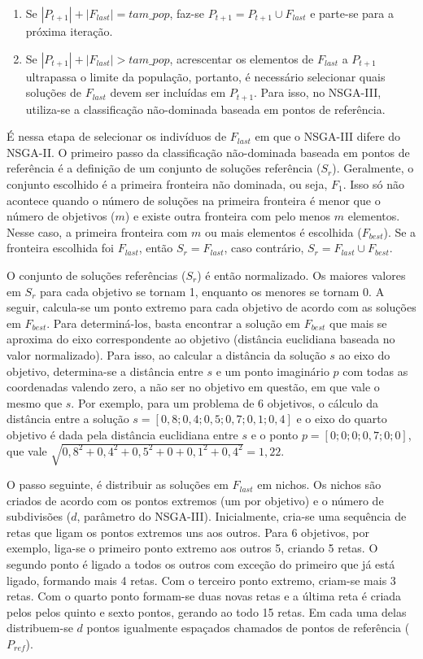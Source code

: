 \begin{enumerate}
	\item Se $|P_{t+1}| + |F_{last}| = tam\_pop$, faz-se $P_{t+1} = P_{t+1} \cup F_{last}$ e parte-se para a próxima iteração.
	\item Se $|P_{t+1}| + |F_{last}| > tam\_pop$, acrescentar os elementos de $F_{last}$ a $P_{t+1}$ ultrapassa o limite da população, portanto, é necessário selecionar quais soluções de $F_{last}$ devem ser incluídas em $P_{t+1}$. Para isso, no NSGA-III, utiliza-se a classificação não-dominada baseada em pontos de referência.
\end{enumerate}

É nessa etapa de selecionar os indivíduos de $F_{last}$ em que o NSGA-III difere do NSGA-II. O primeiro passo da classificação não-dominada baseada em pontos de referência é a definição de um conjunto de soluções referência ($S_r$). Geralmente, o conjunto escolhido é a primeira fronteira não dominada, ou seja, $F_1$. Isso só não acontece quando o número de soluções na primeira fronteira é menor que o número de objetivos ($m$) e existe outra fronteira com pelo menos $m$ elementos. Nesse caso, a primeira fronteira com $m$ ou mais elementos é escolhida ($F_{best}$). Se a fronteira escolhida foi $F_{last}$, então $S_r = F_{last}$, caso contrário, $S_r = F_{last} \cup F_{best}$.

O conjunto de soluções referências ($S_r$) é então normalizado. Os maiores valores em $S_r$ para cada objetivo se tornam 1, enquanto os menores se tornam 0. A seguir, calcula-se um ponto extremo para cada objetivo de acordo com as soluções em $F_{best}$. Para determiná-los, basta encontrar a solução em $F_{best}$ que mais se aproxima do eixo correspondente ao objetivo (distância euclidiana baseada no valor normalizado). Para isso, ao calcular a distância da solução $s$ ao eixo do objetivo, determina-se a distância entre $s$ e um ponto imaginário $p$ com todas as coordenadas valendo zero, a não ser no objetivo em questão, em que vale o mesmo que $s$. Por exemplo, para um problema de 6 objetivos, o cálculo da distância entre a solução $s = [0,8; 0,4; 0,5; 0,7; 0,1; 0,4]$ e o eixo do quarto objetivo é dada pela distância euclidiana entre $s$ e o ponto $p = [0; 0; 0; 0,7; 0; 0]$, que vale $\sqrt{0,8^2 + 0,4^2 + 0,5^2 + 0 + 0,1^2 + 0,4^2} = 1,22$.

O passo seguinte, é distribuir as soluções em $F_{last}$ em nichos. Os nichos são criados de acordo com os pontos extremos (um por objetivo) e o número de subdivisões ($d$, parâmetro do NSGA-III). Inicialmente, cria-se uma sequência de retas que ligam os pontos extremos uns aos outros. Para 6 objetivos, por exemplo, liga-se o primeiro ponto extremo aos outros 5, criando 5 retas. O segundo ponto é ligado a todos os outros com exceção do primeiro que já está ligado, formando mais 4 retas. Com o terceiro ponto extremo, criam-se mais 3 retas. Com o quarto ponto formam-se duas novas retas e a última reta é criada pelos pelos quinto e sexto pontos, gerando ao todo 15 retas. Em cada uma delas distribuem-se $d$ pontos igualmente espaçados chamados de pontos de referência ($P_{ref}$).

